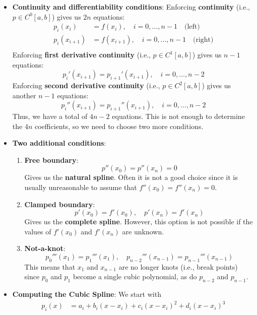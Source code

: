 \documentclass{report}
\begin{document}
\begin{itemize}
        \item \textbf{Continuity and differentiability conditions}:
            Enforcing \textbf{continuity} (i.e., $p \in C^0[a,b]$) gives us $2n$ equations:
            $$
            \begin{align}
                p_i(x_i) &= f(x_i), \quad i = 0, \dots, n-1 \quad \text{(left)}\\
                p_i(x_{i+1}) &= f(x_{i+1}), \quad i = 0, \dots, n-1 \quad \text{(right)}\\
            \end{align}
            $$
            Enforcing \textbf{first derivative continuity} (i.e., $p \in C^1[a,b]$) gives us $n-1$ equations:
            $$
            p_i'(x_{i+1}) = p_{i+1}'(x_{i+1}), \quad i = 0, \dots, n-2
            $$
            Enforcing \textbf{second derivative continuity} (i.e., $p \in C^2[a,b]$) gives us another $n-1$ equations:
            $$
            p_i''(x_{i+1}) = p_{i+1}''(x_{i+1}), \quad i = 0, \dots, n-2
            $$
            Thus, we have a total of $4n - 2$ equations. This is not enough to determine the $4n$ coefficients, so we need to choose two more conditions.
        \item \textbf{Two additional conditions}:
            \begin{enumerate}
                \item \textbf{Free boundary}:
                    $$p''(x_0) = p''(x_n) = 0$$
                    Gives us the \textbf{natural spline}. Often it is not a good choice since it is usually unreasonable to assume that $f''(x_0) = f''(x_n) = 0$.
                \item \textbf{Clamped boundary}:
                    $$p'(x_0) = f'(x_0), \quad p'(x_n) = f'(x_n)$$
                    Gives us the \textbf{complete spline}. However, this option is not possible if the values of $f'(x_0)$ and $f'(x_n)$ are unknown.
                \item \textbf{Not-a-knot}:
                    $$p_0'''(x_1) = p_1'''(x_1), \quad p_{n-2}'''(x_{n-1}) = p_{n-1}'''(x_{n-1})$$
                    This means that $x_1$ and $x_{n-1}$ are no longer knots (i.e., break points) since $p_0$ and $p_1$ become a single cubic polynomial, as do $p_{n-2}$ and $p_{n-1}$.
            \end{enumerate}
        \item \textbf{Computing the Cubic Spline}:
            We start with
            $$
            \begin{align}
                p_i(x) &= a_i + b_i(x-x_i) + c_i(x-x_i)^2 + d_i(x-x_i)^3\\

\end{align}$$
\end{itemize}
\end{document}
